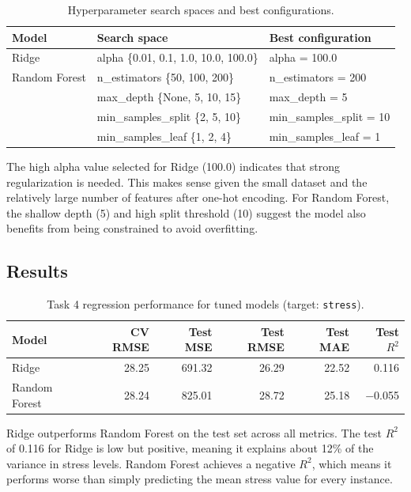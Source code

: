 \documentclass[runningheads]{llncs}
\begin{document}
\begin{table}[h]
\caption{Hyperparameter search spaces and best configurations.}
\label{tab:task4_hyper}
\centering
\begin{tabular}{|l|l|l|}
\hline
Model & Search space & Best configuration \\
\hline
Ridge & alpha \{0.01, 0.1, 1.0, 10.0, 100.0\} & alpha = 100.0 \\
\hline
Random Forest & n\_estimators \{50, 100, 200\} & n\_estimators = 200 \\
 & max\_depth \{None, 5, 10, 15\} & max\_depth = 5 \\
 & min\_samples\_split \{2, 5, 10\} & min\_samples\_split = 10 \\
 & min\_samples\_leaf \{1, 2, 4\} & min\_samples\_leaf = 1 \\
\hline
\end{tabular}
\end{table}

The high alpha value selected for Ridge (100.0) indicates that strong regularization is needed. This makes sense given the small dataset and the relatively large number of features after one-hot encoding. For Random Forest, the shallow depth (5) and high split threshold (10) suggest the model also benefits from being constrained to avoid overfitting.

\subsection*{Results}

\begin{table}[h]
\caption{Task 4 regression performance for tuned models (target: \texttt{stress}).}
\label{tab:task4_results}
\centering
\begin{tabular}{|l|r|r|r|r|r|}
\hline
Model & CV RMSE & Test MSE & Test RMSE & Test MAE & Test $R^2$ \\
\hline
Ridge & 28.25 & 691.32 & 26.29 & 22.52 & 0.116 \\
Random Forest & 28.24 & 825.01 & 28.72 & 25.18 & $-$0.055 \\
\hline
\end{tabular}
\end{table}

Ridge outperforms Random Forest on the test set across all metrics. The test $R^2$ of 0.116 for Ridge is low but positive, meaning it explains about 12\% of the variance in stress levels. Random Forest achieves a negative $R^2$, which means it performs worse than simply predicting the mean stress value for every instance.
\end{document}
